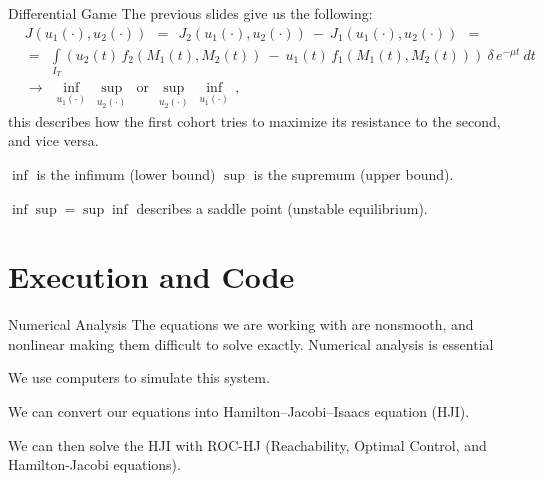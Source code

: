 \documentclass{beamer}
\begin{document}
\begin{frame}{Differential Game}
    The previous slides give us the following:
    $$
    \begin{aligned}
    & J(u_1(\cdot), u_2(\cdot)) \:\: = \:\: J_2(u_1(\cdot), u_2(\cdot)) \: - \: J_1(u_1(\cdot), u_2(\cdot)) \:\: = \\
    & = \:\: \int\limits_{I_T} (u_2(t) \, f_2(M_1(t), M_2(t)) \: - \: u_1(t) \, f_1(M_1(t), M_2(t))) \: \delta \, e^{-\mu t} \: dt \:\:
    \\& \longrightarrow \:\: \inf_{u_1(\cdot)} \: \sup_{u_2(\cdot)} \:\: \mbox{or} \:\:
    \sup_{u_2(\cdot)} \: \inf_{u_1(\cdot)} \, ,
    \end{aligned}
    $$ \pause
    this describes how the first cohort tries to maximize its resistance to the second, and vice versa.\newline
    
    $\inf$ is the infimum (lower bound) $\sup$ is the supremum (upper bound).\newline
    
    $\inf\sup=\sup\inf$ describes a saddle point (unstable equilibrium).
    
\end{frame}

\section{Execution and Code}
\begin{frame}{Numerical Analysis}
    The equations we are working with are nonsmooth, and nonlinear making them difficult to solve exactly. Numerical analysis is essential \newline\pause

    We use computers to simulate this system. \newline\pause
    
    We can convert our equations into Hamilton--Jacobi--Isaacs equation (HJI). \newline\pause
    
    We can then solve the HJI with ROC-HJ (Reachability, Optimal Control, and Hamilton-Jacobi equations).
\end{frame}
\end{document}
